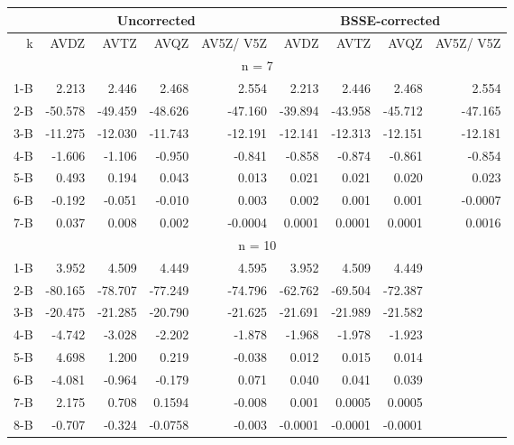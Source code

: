 \begin{table}[]
\centering
\begin{tabular}{@{}rrrrrrrrr@{}}
\toprule
     & \multicolumn{4}{c}{Uncorrected}         & \multicolumn{4}{c}{BSSE-corrected}      \\ \midrule
k    & AVDZ    & AVTZ    & AVQZ    & AV5Z/ V5Z & AVDZ    & AVTZ    & AVQZ    & AV5Z/ V5Z \\
\hline
\multicolumn{9}{c}{n = 7}                                                                \\
\hline
1-B  & 2.213   & 2.446   & 2.468   & 2.554     & 2.213   & 2.446   & 2.468   & 2.554     \\
2-B  & -50.578 & -49.459 & -48.626 & -47.160   & -39.894 & -43.958 & -45.712 & -47.165   \\
3-B  & -11.275 & -12.030 & -11.743 & -12.191   & -12.141 & -12.313 & -12.151 & -12.181   \\
4-B  & -1.606  & -1.106  & -0.950  & -0.841    & -0.858  & -0.874  & -0.861  & -0.854    \\
5-B  & 0.493   & 0.194   & 0.043   & 0.013     & 0.021   & 0.021   & 0.020   & 0.023     \\
6-B  & -0.192  & -0.051  & -0.010  & 0.003     & 0.002   & 0.001   & 0.001   & -0.0007   \\
7-B  & 0.037   & 0.008   & 0.002   & -0.0004   & 0.0001  & 0.0001  & 0.0001  & 0.0016    \\
\hline
\multicolumn{9}{c}{n = 10}                                                               \\
\hline
1-B  & 3.952   & 4.509   & 4.449   & 4.595     & 3.952   & 4.509   & 4.449   &           \\
2-B  & -80.165 & -78.707 & -77.249 & -74.796   & -62.762 & -69.504 & -72.387 &           \\
3-B  & -20.475 & -21.285 & -20.790 & -21.625   & -21.691 & -21.989 & -21.582 &           \\
4-B  & -4.742  & -3.028  & -2.202  & -1.878    & -1.968  & -1.978  & -1.923  &           \\
5-B  & 4.698   & 1.200   & 0.219   & -0.038    & 0.012   & 0.015   & 0.014   &           \\
6-B  & -4.081  & -0.964  & -0.179  & 0.071     & 0.040   & 0.041   & 0.039   &           \\
7-B  & 2.175   & 0.708   & 0.1594  & -0.008    & 0.001   & 0.0005  & 0.0005  &           \\
8-B  & -0.707  & -0.324  & -0.0758 & -0.003    & -0.0001 & -0.0001 & -0.0001 &           \\

\end{tabular}
\end{table}
